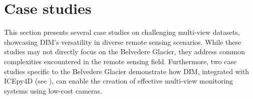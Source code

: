 
\section{Case studies}\label{sec:5:methods}

This section presents several case studies on challenging multi-view datasets, showcasing DIM's versatility in diverse remote sensing scenarios.
While these studies may not directly focus on the Belvedere Glacier, they address common complexities encountered in the remote sensing field.  
Furthermore, two case studies specific to the Belvedere Glacier demonstrate how DIM, integrated with ICEpy4D (see ), can enable the creation of effective multi-view monitoring systems using low-cost cameras.






